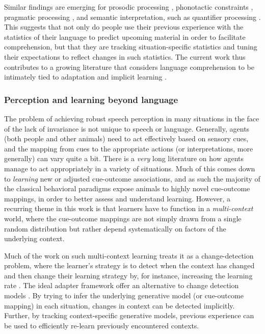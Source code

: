 Similar findings are emerging for prosodic processing \autocite{Kurumada2013}, phonotactic constraints \autocite{Chambers2010,Dell2000,Goldrick2004,Warker2006}, pragmatic processing \autocite{Grodner2011}, and semantic interpretation, such as quantifier processing \autocite{Yildirim2013}. This suggests that not only do people use their previous experience with the statistics of their language to predict upcoming material in order to facilitate comprehension, but that they are tracking situation-specific statistics and tuning their expectations to reflect changes in such statistics. The current work thus contributes to a growing literature that considers language comprehension to be intimately tied to adaptation and implicit learning \autocite[see also][]{Dell2014,Chang2006,Fine2013,Jaeger2013,Jaeger2013a,MacDonald2013}.

\subsubsection{Perception and learning beyond language}
\label{sec:doma-gener-perc}
\label{r4-domain-gen-learn}

The problem of achieving robust speech perception in many situations in the face of the lack of invariance is not unique to speech or language.
Generally, agents (both people and other animals) need to act effectively based on sensory cues, and the mapping from cues to the appropriate actions (or interpretations, more generally) can vary quite a bit.
There is a \emph{very} long literature on how agents manage to act appropriately in a variety of situations.  Much of this comes down to \emph{learning} new or adjusted cue-outcome associations, and as such the majority of the classical behavioral paradigms expose animals to highly novel cue-outcome mappings, in order to better assess and understand learning.
However, a recurring theme in this work is that learners have to function in  a \emph{multi-context} world, where the cue-outcome mappings are not simply drawn from a single random distribution but rather depend systematically on factors of the underlying context.  

Much of the work on such multi-context learning treats it as a change-detection problem, where the learner's strategy is to detect when the context has changed and then change their learning strategy by, for instance, increasing the learning rate \autocite[e.g.,][]{Courville2006,Gallistel2001}.
The ideal adapter framework offer an alternative to change detection models \autocite[see also related proposals discussed in][]{Qian2012}.  By trying to infer the underlying generative model (or cue-outcome mapping) in each situation, changes in context can be detected implicitly.  Further, by tracking context-specific generative models, previous experience can be used to efficiently re-learn previously encountered contexts.

